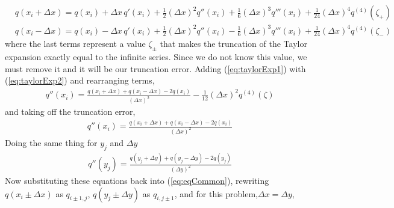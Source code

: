 \begin{enumerate}
	\begin{align}
		& q(x_i+\Delta x) = q(x_i) + \Delta x \, q'(x_i) + \frac{1}{2} (\Delta x)^2 q''(x_i) + \frac{1}{6} (\Delta x)^3 q'''(x_i) + \frac{1}{24} (\Delta x)^4 q^{(4)}(\zeta_+) \label{eq:taylorExp1}\\
		& q(x_i-\Delta x) = q(x_i) - \Delta x \, q'(x_i) + \frac{1}{2} (\Delta x)^2 q''(x_i) - \frac{1}{6} (\Delta x)^3 q'''(x_i) + \frac{1}{24} (\Delta x)^4 q^{(4)}(\zeta_-) \label{eq:taylorExp2} 
	\end{align}
	where the last terms represent a value $\zeta_\pm$ that makes the truncation of the Taylor expansion exactly equal to the infinite series. Since we do not know this value, we must remove it and it will be our truncation error. Adding (\ref{eq:taylorExp1}) with (\ref{eq:taylorExp2}) and rearranging terms, 
	\begin{align*}
		& q''(x_i) = \frac{q(x_i + \Delta x) + q(x_i-\Delta x) - 2 q(x_i)}{(\Delta x)^2} - \frac{1}{12} (\Delta x)^2 q^{(4)}(\zeta) 
	\end{align*}
	and taking off the truncation error, 
	\begin{align*}
		& q''(x_i) = \frac{q(x_i + \Delta x) + q(x_i-\Delta x) - 2 q(x_i)}{(\Delta x)^2} 
	\end{align*}
	Doing the same thing for $y_j$ and $\Delta y$ 
	\begin{align*}
		& q''(y_j) = \frac{q(y_j + \Delta y) + q(y_j-\Delta y) - 2 q(y_j)}{(\Delta y)^2} 
	\end{align*}
	Now substituting these equations back into (\ref{eq:eqCommon}), rewriting $q(x_i\pm\Delta x)$ as $q_{i\pm1,j}$, $q(y_j\pm\Delta y)$ as $q_{i,j\pm1}$, and for this problem,$\Delta x = \Delta y$,
	

\end{enumerate}
